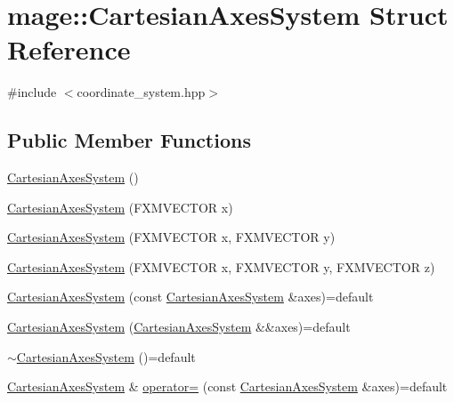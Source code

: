 \hypertarget{structmage_1_1_cartesian_axes_system}{}\section{mage\+:\+:Cartesian\+Axes\+System Struct Reference}
\label{structmage_1_1_cartesian_axes_system}


{\ttfamily \#include $<$coordinate\+\_\+system.\+hpp$>$}

\subsection*{Public Member Functions}
\begin{DoxyCompactItemize}
\item 
\hyperlink{structmage_1_1_cartesian_axes_system_a8f6ebcd50aafda44c478b7aa25e1fd25}{Cartesian\+Axes\+System} ()
\item 
\hyperlink{structmage_1_1_cartesian_axes_system_af0292def50b18859db52882f8e605fbb}{Cartesian\+Axes\+System} (F\+X\+M\+V\+E\+C\+T\+OR x)
\item 
\hyperlink{structmage_1_1_cartesian_axes_system_a249872c172449f181ef9301f7c3d9b10}{Cartesian\+Axes\+System} (F\+X\+M\+V\+E\+C\+T\+OR x, F\+X\+M\+V\+E\+C\+T\+OR y)
\item 
\hyperlink{structmage_1_1_cartesian_axes_system_a7c35769ae4f7d4abb3763168edefe162}{Cartesian\+Axes\+System} (F\+X\+M\+V\+E\+C\+T\+OR x, F\+X\+M\+V\+E\+C\+T\+OR y, F\+X\+M\+V\+E\+C\+T\+OR z)
\item 
\hyperlink{structmage_1_1_cartesian_axes_system_a272ec4e772d87965617ba28957f5a558}{Cartesian\+Axes\+System} (const \hyperlink{structmage_1_1_cartesian_axes_system}{Cartesian\+Axes\+System} \&axes)=default
\item 
\hyperlink{structmage_1_1_cartesian_axes_system_abb84a76b227afbb86f618140a7ae1968}{Cartesian\+Axes\+System} (\hyperlink{structmage_1_1_cartesian_axes_system}{Cartesian\+Axes\+System} \&\&axes)=default
\item 
\hyperlink{structmage_1_1_cartesian_axes_system_a8c32f25e03757c03506d9a93bddf5d13}{$\sim$\+Cartesian\+Axes\+System} ()=default
\item 
\hyperlink{structmage_1_1_cartesian_axes_system}{Cartesian\+Axes\+System} \& \hyperlink{structmage_1_1_cartesian_axes_system_af52da9fbab85fc87921eff0ef6a17fe4}{operator=} (const \hyperlink{structmage_1_1_cartesian_axes_system}{Cartesian\+Axes\+System} \&axes)=default
\item 

\end{DoxyCompactItemize}

